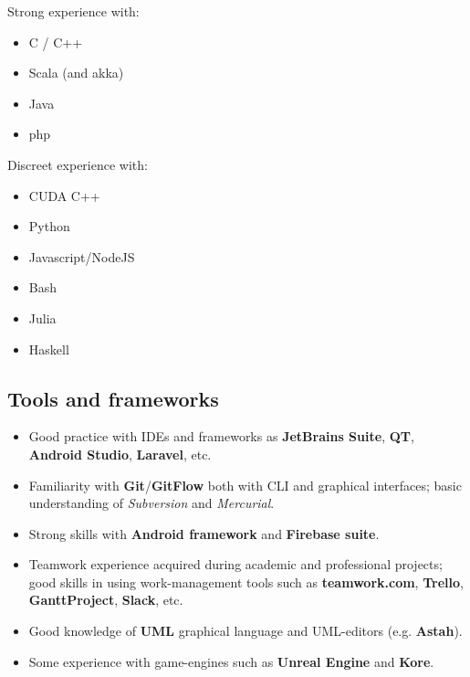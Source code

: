 \documentclass[letterpaper]{twentysecondcv} %
\begin{document}
\begin{minipage}[t]{0.45\linewidth}
	Strong experience with:
	\small
	\begin{itemize}[noitemsep]
		\item C / C++
		\item Scala (and akka)
		\item Java
		\item php
	\end{itemize}
\end{minipage}
\begin{minipage}[t]{0.45\linewidth}
	Discreet experience with:
	\footnotesize
	\begin{itemize}[noitemsep,nolistsep]
		\item CUDA C++
		\item Python
		\item Javascript/NodeJS
		\item Bash
		\item Julia
		\item Haskell
	\end{itemize}
\end{minipage}


\subsection{Tools and frameworks}
\begin{itemize}[noitemsep,nolistsep]
	\item Good practice with IDEs and frameworks as \textbf{JetBrains Suite}, \textbf{QT}, \textbf{Android Studio}, \textbf{Laravel}, etc.
	\item Familiarity with \textbf{Git}/\textbf{GitFlow} both with CLI and graphical interfaces; basic understanding of \textit{Subversion} and \textit{Mercurial}.
	\item Strong skills with \textbf{Android framework} and \textbf{Firebase suite}.
	\item Teamwork experience acquired during academic and professional projects; good skills in using work-management tools such as \textbf{teamwork.com}, \textbf{Trello}, \textbf{GanttProject}, \textbf{Slack}, etc.
	\item Good knowledge of \textbf{UML} graphical language and UML-editors (e.g. \textbf{Astah}).
	\item Some experience with game-engines such as \textbf{Unreal Engine} and \textbf{Kore}.
\end{itemize}
\end{document}
